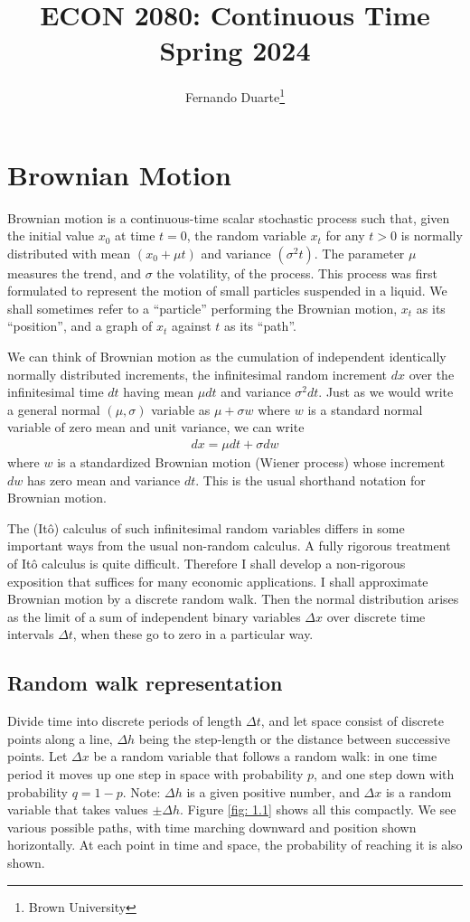 \documentclass[12pt]{article}
\title{ECON 2080: Continuous Time\\Spring 2024}
\author{Fernando Duarte\thanks{Brown University}}
\date{}
\theoremstyle{definition}
\begin{document}
\maketitle


\section{Brownian Motion}
Brownian motion is a continuous-time scalar stochastic process such that, given the initial value $x_{0}$ at time $t=0$, the random variable $x_{t}$ for any $t>0$ is normally distributed with mean $\left(x_{0}+\mu t\right)$ and variance $\left(\sigma^{2} t\right)$. The parameter $\mu$ measures the trend, and $\sigma$ the volatility, of the process. This process was first formulated to represent the motion of small particles suspended in a liquid. We shall sometimes refer to a ``particle'' performing the Brownian motion, $x_{t}$ as its ``position'', and a graph of $x_{t}$ against $t$ as its ``path''.

We can think of Brownian motion as the cumulation of independent identically normally distributed increments, the infinitesimal random increment $dx$ over the infinitesimal time $dt$ having mean $\mu dt$ and variance $\sigma^{2} dt$. Just as we would write a general normal $(\mu, \sigma)$ variable as $\mu+\sigma w$ where $w$ is a standard normal variable of zero mean and unit variance, we can write
\begin{align}
dx=\mu dt+\sigma dw \label{1.1}
\end{align}
where $w$ is a standardized Brownian motion (Wiener process) whose increment $dw$ has zero mean and variance $dt$. This is the usual shorthand notation for Brownian motion.

The (Itô) calculus of such infinitesimal random variables differs in some important ways from the usual non-random calculus. A fully rigorous treatment of Itô calculus is quite difficult. Therefore I shall develop a non-rigorous exposition that suffices for many economic applications. I shall approximate Brownian motion by a discrete random walk. Then the normal distribution arises as the limit of a sum
of independent binary variables $\Delta x$ over discrete time intervals $\Delta t$, when these go to zero in a particular way.

\subsection{Random walk representation}
Divide time into discrete periods of length $\Delta t$, and let space consist of discrete points along a line, $\Delta h$ being the step-length or the distance between successive points. Let $\Delta x$ be a random variable that follows a random walk: in one time period it moves up one step in space with probability $p$, and one step down with probability $q=1-p$. Note: $\Delta h$ is a given positive number, and $\Delta x$ is a random variable that takes values $\pm \Delta h$. Figure \ref{fig: 1.1} shows all this compactly. We see various possible paths, with time marching downward and position shown horizontally. At each point in time and space, the probability of reaching it is also shown.
\end{document}
